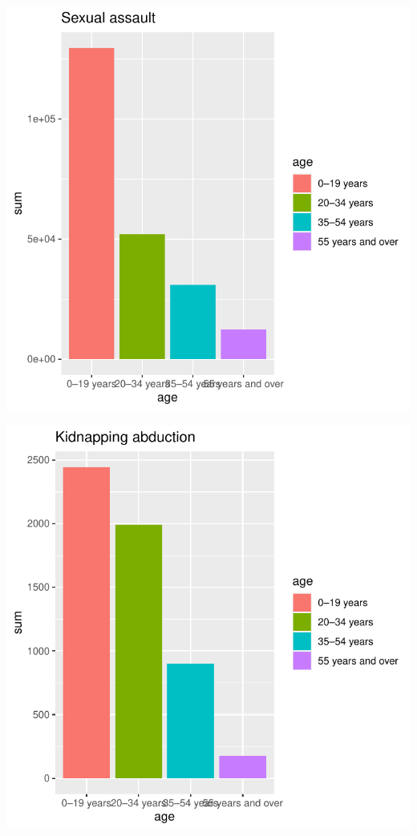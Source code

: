 \documentclass[11pt,a4paper,]{article}
\begin{document}
\includegraphics{report_files/figure-latex/sexplot-1.pdf}

\includegraphics{report_files/figure-latex/kidplot-1.pdf}
\end{document}
